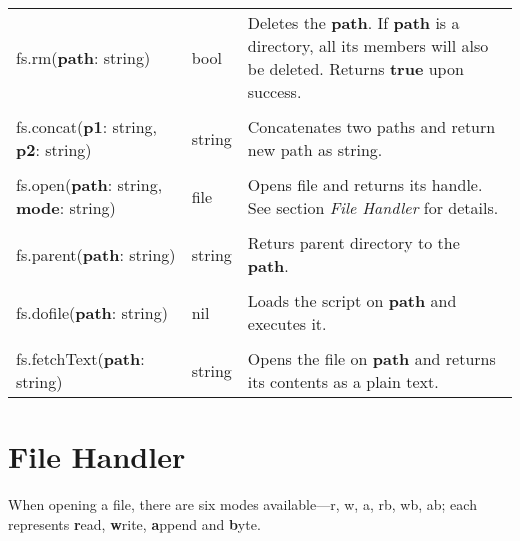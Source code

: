 \begin{tabularx}{\textwidth}{l l X}
	fs.rm(\textbf{path}: string) & bool & Deletes the \textbf{path}. If \textbf{path} is a directory, all its members will also be deleted. Returns \textbf{true} upon success.
	\\ \\
	fs.concat(\textbf{p1}: string, \textbf{p2}: string) & string & Concatenates two paths and return new path as string.
	\\ \\
	fs.open(\textbf{path}: string, \textbf{mode}: string) & file & Opens file and returns its handle. See section \emph{File Handler} for details.
	\\ \\
	fs.parent(\textbf{path}: string) & string & Returs parent directory to the \textbf{path}.
	\\ \\
	fs.dofile(\textbf{path}: string) & nil & Loads the script on \textbf{path} and executes it.
	\\ \\
	fs.fetchText(\textbf{path}: string) & string & Opens the file on \textbf{path} and returns its contents as a plain text.
\end{tabularx}

\section{File Handler}

When opening a file, there are six modes available---r, w, a, rb, wb, ab; each represents \textbf{r}ead, \textbf{w}rite, \textbf{a}ppend and \textbf{b}yte.

